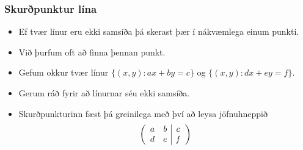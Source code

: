 \documentclass{beamer}
\newcommand\env[2]
{
	\begin{#1}
	#2
	\end{#1}
}
\begin{document}
\env{frame}
{
	\frametitle{Skurðpunktur lína}
	\env{itemize}
	{
		\item<1-> Ef tvær línur eru ekki samsíða þá skerast þær í nákvæmlega einum punkti.
		\item<2-> Við þurfum oft að finna þennan punkt.
		\item<3-> Gefum okkur tvær línur $\{(x, y) : ax + by=c\}$ og $\{(x, y) : dx + ey=f\}$.
		\item<4-> Gerum ráð fyrir að línurnar séu ekki samsíða.
		\item<5-> Skurðpunkturinn fæst þá greinilega með því að leysa jöfnuhneppið
			\[
				\left (
				\begin{array}{c c | c}
					a & b & c\\
					d & e & f
				\end{array}
				\right )
			\]
	}
}
\end{document}
